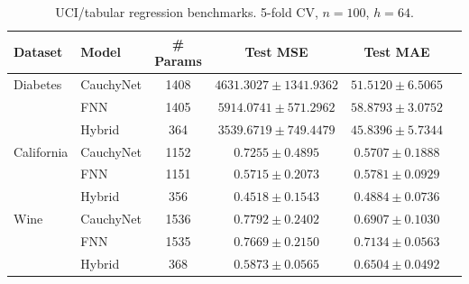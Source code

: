 \begin{table}[ht]\centering
\caption{UCI/tabular regression benchmarks. 5-fold CV, $n=100$, $h=64$.}
\label{tab:uci}
\begin{tabular}{llcccc}
\toprule
Dataset & Model & \# Params & Test MSE & Test MAE \\
\midrule
Diabetes & CauchyNet & 1408 & $4631.3027 \pm 1341.9362$ & $51.5120 \pm 6.5065$ \\
 & FNN & 1405 & $5914.0741 \pm 571.2962$ & $58.8793 \pm 3.0752$ \\
 & Hybrid & 364 & $3539.6719 \pm 749.4479$ & $45.8396 \pm 5.7344$ \\
\midrule
California & CauchyNet & 1152 & $0.7255 \pm 0.4895$ & $0.5707 \pm 0.1888$ \\
 & FNN & 1151 & $0.5715 \pm 0.2073$ & $0.5781 \pm 0.0929$ \\
 & Hybrid & 356 & $0.4518 \pm 0.1543$ & $0.4884 \pm 0.0736$ \\
\midrule
Wine & CauchyNet & 1536 & $0.7792 \pm 0.2402$ & $0.6907 \pm 0.1030$ \\
 & FNN & 1535 & $0.7669 \pm 0.2150$ & $0.7134 \pm 0.0563$ \\
 & Hybrid & 368 & $0.5873 \pm 0.0565$ & $0.6504 \pm 0.0492$ 
\bottomrule
\end{tabular}
\end{table}